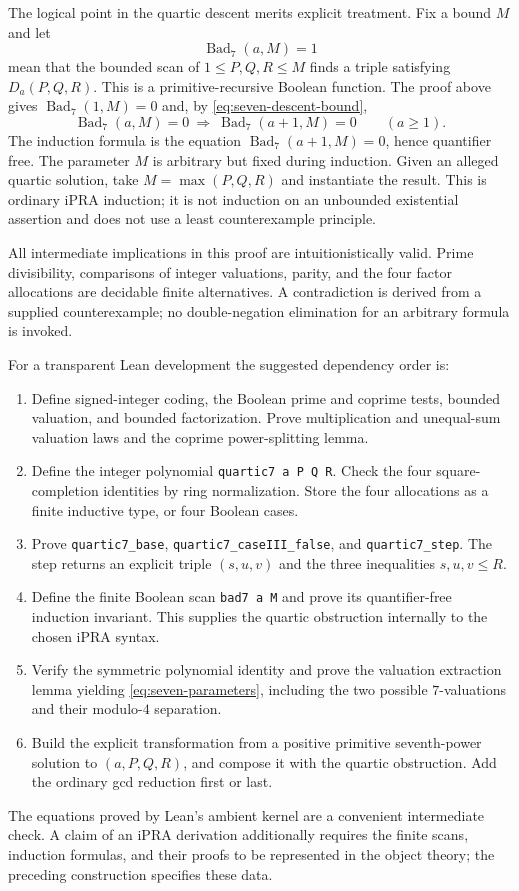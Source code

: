 The logical point in the quartic descent merits explicit treatment.  Fix a
bound $M$ and let
\[
 \operatorname{Bad}_7(a,M)=1
\]
mean that the bounded scan of $1\leq P,Q,R\leq M$ finds a triple satisfying
$D_a(P,Q,R)$.  This is a primitive-recursive Boolean function.  The proof
above gives $\operatorname{Bad}_7(1,M)=0$ and, by
\eqref{eq:seven-descent-bound},
\[
 \operatorname{Bad}_7(a,M)=0\ \Longrightarrow\
 \operatorname{Bad}_7(a+1,M)=0 \qquad(a\geq1).
\]
The induction formula is the equation
$\operatorname{Bad}_7(a+1,M)=0$, hence quantifier free.  The parameter $M$
is arbitrary but fixed during induction.  Given an alleged quartic
solution, take $M=\max(P,Q,R)$ and instantiate the result.  This is ordinary
iPRA induction; it is not induction on an unbounded existential assertion
and does not use a least counterexample principle.

All intermediate implications in this proof are intuitionistically valid.
Prime divisibility, comparisons of integer valuations, parity, and the four
factor allocations are decidable finite alternatives.  A contradiction is
derived from a supplied counterexample; no double-negation elimination for
an arbitrary formula is invoked.

For a transparent Lean development the suggested dependency order is:
\begin{enumerate}
\item Define signed-integer coding, the Boolean prime and coprime tests,
      bounded valuation, and bounded factorization.  Prove multiplication
      and unequal-sum valuation laws and the coprime power-splitting lemma.
\item Define the integer polynomial \texttt{quartic7 a P Q R}.  Check the
      four square-completion identities by ring normalization.  Store the
      four allocations as a finite inductive type, or four Boolean cases.
\item Prove \texttt{quartic7\_base}, \texttt{quartic7\_caseIII\_false}, and
      \texttt{quartic7\_step}.  The step returns an explicit triple
      $(s,u,v)$ and the three inequalities $s,u,v\leq R$.
\item Define the finite Boolean scan \texttt{bad7 a M} and prove its
      quantifier-free induction invariant.  This supplies the quartic
      obstruction internally to the chosen iPRA syntax.
\item Verify the symmetric polynomial identity and prove the valuation
      extraction lemma yielding \eqref{eq:seven-parameters}, including the
      two possible $7$-valuations and their modulo-$4$ separation.
\item Build the explicit transformation from a positive primitive
      seventh-power solution to $(a,P,Q,R)$, and compose it with the
      quartic obstruction.  Add the ordinary gcd reduction first or last.
\end{enumerate}
The equations proved by Lean's ambient kernel are a convenient intermediate
check.  A claim of an iPRA derivation additionally requires the finite scans,
induction formulas, and their proofs to be represented in the object theory;
the preceding construction specifies these data.
